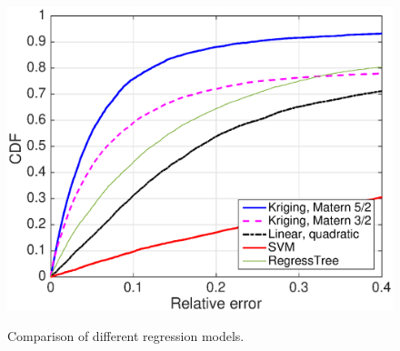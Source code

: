 \begin{figure}[t]
    \centering
{\includegraphics[width=0.8\columnwidth]{figures/all}}
  \caption{Comparison of different regression models. \label{fig:regress-models}}
\end{figure}





